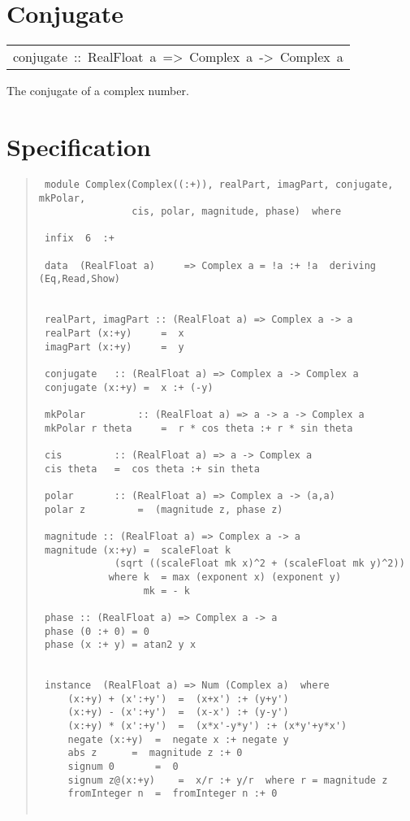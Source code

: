 \section{Conjugate
}
\begin{haddockdesc}
\item[\begin{tabular}{@{}l}
conjugate\ ::\ RealFloat\ a\ =>\ Complex\ a\ ->\ Complex\ a
\end{tabular}]\haddockbegindoc
The conjugate of a complex number.
\par

\end{haddockdesc}
\section{Specification
}
\begin{quote}
{\haddockverb\begin{verbatim}
 module Complex(Complex((:+)), realPart, imagPart, conjugate, mkPolar,
                cis, polar, magnitude, phase)  where
 
 infix  6  :+
 
 data  (RealFloat a)     => Complex a = !a :+ !a  deriving (Eq,Read,Show)
 
 
 realPart, imagPart :: (RealFloat a) => Complex a -> a
 realPart (x:+y)	 =  x
 imagPart (x:+y)	 =  y
 
 conjugate	 :: (RealFloat a) => Complex a -> Complex a
 conjugate (x:+y) =  x :+ (-y)
 
 mkPolar		 :: (RealFloat a) => a -> a -> Complex a
 mkPolar r theta	 =  r * cos theta :+ r * sin theta
 
 cis		 :: (RealFloat a) => a -> Complex a
 cis theta	 =  cos theta :+ sin theta
 
 polar		 :: (RealFloat a) => Complex a -> (a,a)
 polar z		 =  (magnitude z, phase z)
 
 magnitude :: (RealFloat a) => Complex a -> a
 magnitude (x:+y) =  scaleFloat k
 		     (sqrt ((scaleFloat mk x)^2 + (scaleFloat mk y)^2))
 		    where k  = max (exponent x) (exponent y)
 		          mk = - k
 
 phase :: (RealFloat a) => Complex a -> a
 phase (0 :+ 0) = 0
 phase (x :+ y) = atan2 y x
 
 
 instance  (RealFloat a) => Num (Complex a)  where
     (x:+y) + (x':+y')	=  (x+x') :+ (y+y')
     (x:+y) - (x':+y')	=  (x-x') :+ (y-y')
     (x:+y) * (x':+y')	=  (x*x'-y*y') :+ (x*y'+y*x')
     negate (x:+y)	=  negate x :+ negate y
     abs z		=  magnitude z :+ 0
     signum 0		=  0
     signum z@(x:+y)	=  x/r :+ y/r  where r = magnitude z
     fromInteger n	=  fromInteger n :+ 0
 

\end{verbatim}}
\end{quote}
